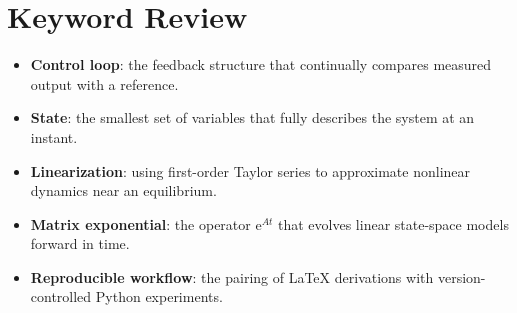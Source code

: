\section{Keyword Review}
\begin{vocabulary}
\begin{itemize}[leftmargin=*]
    \item \textbf{Control loop}: the feedback structure that continually compares measured output with a reference.
    \item \textbf{State}: the smallest set of variables that fully describes the system at an instant.
    \item \textbf{Linearization}: using first-order Taylor series to approximate nonlinear dynamics near an equilibrium.
    \item \textbf{Matrix exponential}: the operator $\mathrm{e}^{A t}$ that evolves linear state-space models forward in time.
    \item \textbf{Reproducible workflow}: the pairing of \LaTeX{} derivations with version-controlled Python experiments.
\end{itemize}
\end{vocabulary}
